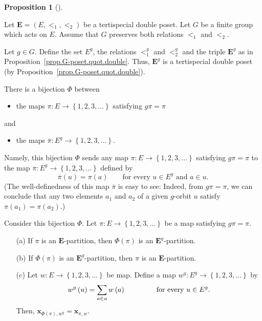 \documentclass[numbers=enddot,12pt,final,onecolumn,notitlepage,abstracton]{scrartcl}%
\theoremstyle{definition}
\newtheorem{prop}[theo]{Proposition}
\newenvironment{proposition}[1][]
{\begin{prop}[#1]\begin{leftbar}}
{\end{leftbar}\end{prop}}
\let\sumnonlimits\sum
\renewcommand{\sum}{\sumnonlimits\limits}
\newcommand{\xx}{{\mathbf{x}}}
\newcommand{\EE}{{\mathbf{E}}}
\begin{document}
\begin{proposition}
\label{prop.G-poset.quot.Phi}
Let $\EE = \left(E, <_1, <_2\right)$ be a tertispecial double poset.
Let $G$ be a finite group which acts on $E$. Assume that $G$ preserves
both relations $<_1$ and $<_2$.

Let $g \in G$. Define the set $E^g$, the relations $<_1^g$ and $<_2^g$
and the triple $\EE^g$ as in Proposition~\ref{prop.G-poset.quot.double}.
Thus, $\EE^g$ is a tertispecial double poset (by
Proposition~\ref{prop.G-poset.quot.double}).


There is a bijection $\Phi$ between

\begin{itemize}
\item the maps $\pi:E\rightarrow\left\{  1,2,3,\ldots\right\}  $ satisfying
$g\pi=\pi$
\end{itemize}

and

\begin{itemize}
\item the maps $\overline{\pi}:E^{g}\rightarrow\left\{  1,2,3,\ldots\right\}
$.
\end{itemize}

Namely, this bijection $\Phi$ sends any map
$\pi:E\rightarrow\left\{  1,2,3,\ldots \right\}  $ satisfying $g\pi=\pi$
to the map $\overline{\pi}:E^{g}
\rightarrow\left\{  1,2,3,\ldots\right\}  $ defined by
\[
\overline{\pi}\left( u \right)
= \pi\left( a \right)
\qquad\text{for every } u \in E^{g} \text{ and } a \in u.
\]
(The well-definedness of this map $\overline{\pi}$ is easy to see:
Indeed, from $g\pi=\pi$, we can conclude that any two elements
$a_1$ and $a_2$ of a given $g$-orbit $u$ satisfy
$\pi\left(a_1\right) = \pi\left(a_2\right)$.)


Consider this bijection $\Phi$. Let
$\pi:E\rightarrow\left\{  1,2,3,\ldots\right\}  $ be a
map satisfying $g\pi=\pi$.

\begin{enumerate}
\item[(a)] If $\pi$ is an $\EE$-partition, then $\Phi\left(
\pi\right)  $ is an $ \EE ^{g}$-partition.

\item[(b)] If $\Phi\left(  \pi\right)  $ is an
$\EE^{g}$-partition, then $\pi$ is an $\EE$-partition.

\item[(c)] Let $w : E \to \left\{1,2,3,\ldots\right\}$ be
map. Define a map $w^{g}:E^{g}\rightarrow
\left\{1,2,3,\ldots\right\}$
by
\[
w^{g}\left(  u\right)  =\sum\limits_{a\in u}w\left(
a\right)  \qquad \qquad \text{ for every } u \in E^g .
\]
Then, $\xx_{\Phi\left(  \pi\right)  ,w^{g}}
=\xx_{\pi,w}$.

\end{enumerate}
\end{proposition}
\end{document}
